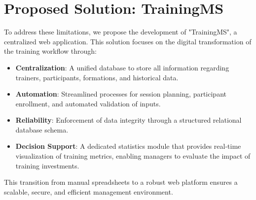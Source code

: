 \section{Proposed Solution: TrainingMS}
To address these limitations, we propose the development of "TrainingMS", a centralized web application. This solution focuses on the digital transformation of the training workflow through:
\begin{itemize}
    \item \textbf{Centralization}: A unified database to store all information regarding trainers, participants, formations, and historical data.
    \item \textbf{Automation}: Streamlined processes for session planning, participant enrollment, and automated validation of inputs.
    \item \textbf{Reliability}: Enforcement of data integrity through a structured relational database schema.
    \item \textbf{Decision Support}: A dedicated statistics module that provides real-time visualization of training metrics, enabling managers to evaluate the impact of training investments.
\end{itemize}
This transition from manual spreadsheets to a robust web platform ensures a scalable, secure, and efficient management environment.
